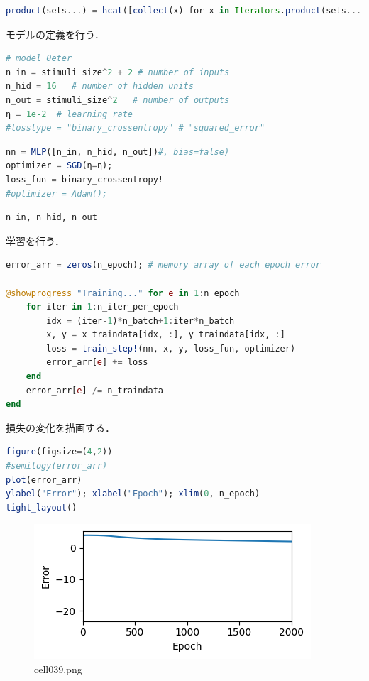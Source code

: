 \begin{lstlisting}[language=julia]
product(sets...) = hcat([collect(x) for x in Iterators.product(sets...)]...)' # Array of Cartesian product of sets 
\end{lstlisting}
モデルの定義を行う．
\begin{lstlisting}[language=julia]
# model θeter
n_in = stimuli_size^2 + 2 # number of inputs
n_hid = 16   # number of hidden units
n_out = stimuli_size^2   # number of outputs
η = 1e-2  # learning rate
#losstype = "binary_crossentropy" # "squared_error"
\end{lstlisting}
\begin{lstlisting}[language=julia]
nn = MLP([n_in, n_hid, n_out])#, bias=false)
optimizer = SGD(η=η);
loss_fun = binary_crossentropy!
#optimizer = Adam();
\end{lstlisting}
\begin{lstlisting}[language=julia]
n_in, n_hid, n_out
\end{lstlisting}
学習を行う．
\begin{lstlisting}[language=julia]
error_arr = zeros(n_epoch); # memory array of each epoch error

@showprogress "Training..." for e in 1:n_epoch
    for iter in 1:n_iter_per_epoch
        idx = (iter-1)*n_batch+1:iter*n_batch
        x, y = x_traindata[idx, :], y_traindata[idx, :]
        loss = train_step!(nn, x, y, loss_fun, optimizer)
        error_arr[e] += loss
    end 
    error_arr[e] /= n_traindata
end
\end{lstlisting}
損失の変化を描画する．
\begin{lstlisting}[language=julia]
figure(figsize=(4,2))
#semilogy(error_arr)
plot(error_arr)
ylabel("Error"); xlabel("Epoch"); xlim(0, n_epoch)
tight_layout()
\end{lstlisting}
\begin{figure}[ht]
	\centering
	\includegraphics[scale=0.8, max width=\linewidth]{./fig/solve-credit-assignment-problem/backpropagation/cell039.png}
	\caption{cell039.png}
	\label{cell039.png}
\end{figure}
